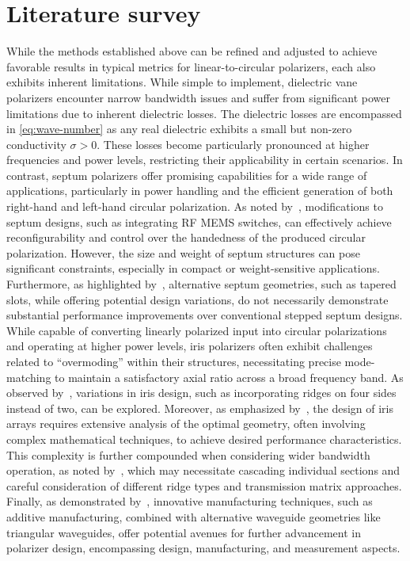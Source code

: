 \documentclass[14pt,a4paper]{ntust_report}
\begin{document}
\section{Literature survey}
While the methods established above can be refined and adjusted to achieve favorable results in typical metrics for linear-to-circular polarizers, each also exhibits inherent limitations. While simple to implement, dielectric vane polarizers encounter narrow bandwidth issues and suffer from significant power limitations due to inherent dielectric losses. The dielectric losses are encompassed in \cref{eq:wave-number} as any real dielectric exhibits a small but non-zero conductivity $\sigma > 0$. These losses become particularly pronounced at higher frequencies and power levels, restricting their applicability in certain scenarios. In contrast, septum polarizers offer promising capabilities for a wide range of applications, particularly in power handling and the efficient generation of both right-hand and left-hand circular polarization. As noted by~\parencite{ruiz-cruz-et-al:compact-reconfigurable-waveguide-circular-polarizer}, modifications to septum designs, such as integrating RF MEMS switches, can effectively achieve reconfigurability and control over the handedness of the produced circular polarization. However, the size and weight of septum structures can pose significant constraints, especially in compact or weight-sensitive applications. Furthermore, as highlighted by~\parencite{wang-et-al:novel-square-rectangle-waveguide-septum-polarizer}, alternative septum geometries, such as tapered slots, while offering potential design variations, do not necessarily demonstrate substantial performance improvements over conventional stepped septum designs. While capable of converting linearly polarized input into circular polarizations and operating at higher power levels, iris polarizers often exhibit challenges related to \enquote{overmoding} within their structures, necessitating precise mode-matching to maintain a satisfactory axial ratio across a broad frequency band. As observed by~\parencite{song-et-al:design-of-wideband-quad-ridge-waveguide-polarizer}, variations in iris design, such as incorporating ridges on four sides instead of two, can be explored. Moreover, as emphasized by~\parencite{virone-et-al:optimum-iris-set-concept-for-waveguide-polarizers}, the design of iris arrays requires extensive analysis of the optimal geometry, often involving complex mathematical techniques, to achieve desired performance characteristics. This complexity is further compounded when considering wider bandwidth operation, as noted by~\parencite{piltyay-et-al:new-tunable-iris-post-square-waveguide-polarizers-for-satelliste-information-systems}, which may necessitate cascading individual sections and careful consideration of different ridge types and transmission matrix approaches. Finally, as demonstrated by~\parencite{deutschmann-arne:broadband-septum-polarizer-with-triangular-common-port}, innovative manufacturing techniques, such as additive manufacturing, combined with alternative waveguide geometries like triangular waveguides, offer potential avenues for further advancement in polarizer design, encompassing design, manufacturing, and measurement aspects.
\end{document}
